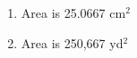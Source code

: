 {\begin{minipage}{\linewidth}\end{minipage}
}
{\begin{enumerate}
\item		Area is 25.0667 cm$^2$
\item		Area is 250,667 yd$^2$
\end{enumerate}
}